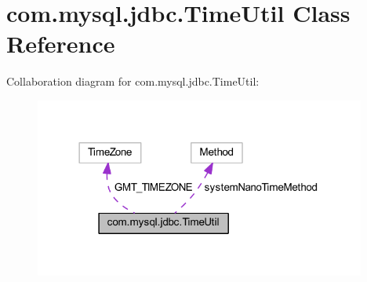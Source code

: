 \hypertarget{classcom_1_1mysql_1_1jdbc_1_1_time_util}{}\section{com.\+mysql.\+jdbc.\+Time\+Util Class Reference}
\label{classcom_1_1mysql_1_1jdbc_1_1_time_util}


Collaboration diagram for com.\+mysql.\+jdbc.\+Time\+Util\+:
\nopagebreak
\begin{figure}[H]
\begin{center}
\leavevmode
\includegraphics[width=309pt]{classcom_1_1mysql_1_1jdbc_1_1_time_util__coll__graph}
\end{center}
\end{figure}

